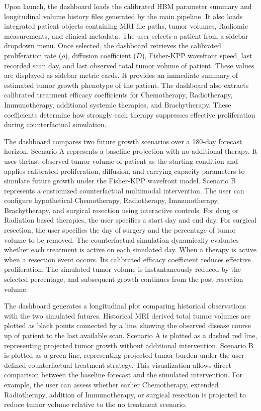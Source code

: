 Upon launch, the dashboard loads the calibrated HBM parameter summary and longitudinal volume history files generated by the main pipeline. It also loads integrated patient objects containing MRI file paths, tumor volumes, Radiomic measurements, and clinical metadata. The user selects a patient from a sidebar dropdown menu. Once selected, the dashboard retrieves the calibrated proliferation rate ($\rho$), diffusion coefficient ($D$), Fisher-KPP wavefront speed, last recorded scan day, and last observed total tumor volume of patient. These values are displayed as sidebar metric cards. It provides an immediate summary of estimated tumor growth phenotype of the patient. The dashboard also extracts calibrated treatment efficacy coefficients for Chemotherapy, Radiotherapy, Immunotherapy, additional systemic therapies, and Brachytherapy. These coefficients determine how strongly each therapy suppresses effective proliferation during counterfactual simulation.

The dashboard compares two future growth scenarios over a 180-day forecast horizon. Scenario A represents a baseline projection with no additional therapy. It uses thelast observed tumor volume of patient as the starting condition and applies calibrated proliferation, diffusion, and carrying capacity parameters to simulate future growth under the Fisher-KPP wavefront model. Scenario B represents a customized counterfactual multimodal intervention. The user can configure hypothetical Chemotherapy, Radiotherapy, Immunotherapy, Brachytherapy, and surgical resection using interactive controls. For drug or Radiation based therapies, the user specifies a start day and end day. For surgical resection, the user specifies the day of surgery and the percentage of tumor volume to be removed. The counterfactual simulation dynamically evaluates whether each treatment is active on each simulated day. When a therapy is active when a resection event occurs. Its calibrated efficacy coefficient reduces effective proliferation. The simulated tumor volume is instantaneously reduced by the selected percentage, and subsequent growth continues from the post resection volume.

The dashboard generates a longitudinal plot comparing historical observations with the two simulated futures. Historical MRI derived total tumor volumes are plotted as black points connected by a line, showing the observed disease course up of patient to the last available scan. Scenario A is plotted as a dashed red line, representing projected tumor growth without additional intervention. Scenario B is plotted as a green line, representing projected tumor burden under the user defined counterfactual treatment strategy. This visualization allows direct comparison between the baseline forecast and the simulated intervention. For example, the user can assess whether earlier Chemotherapy, extended Radiotherapy, addition of Immunotherapy, or surgical resection is projected to reduce tumor volume relative to the no treatment scenario.

